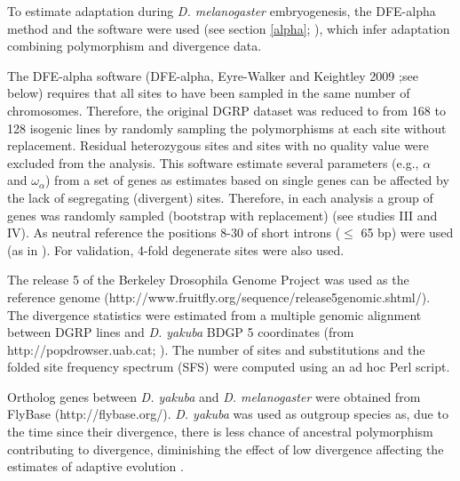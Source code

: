 
To estimate adaptation during \textit{D. melanogaster} embryogenesis, the DFE-alpha method and the software were used (see section \ref{alpha}; \citealp{Eyre-Walker2009}), which infer adaptation combining polymorphism and divergence data.

The DFE-alpha software (DFE-alpha, Eyre-Walker and Keightley 2009 ;see below) requires that all sites to have been sampled in the same number of chromosomes. Therefore, the original DGRP dataset was reduced to from 168 to 128 isogenic lines by randomly sampling the polymorphisms at each site without replacement. Residual heterozygous sites and sites with no quality value were excluded from the analysis.
%
This software estimate several parameters (e.g., $\alpha$ and $\omega_{\alpha}$) from a set of genes as estimates based on single genes can be affected by the lack of segregating (divergent) sites. Therefore, in each analysis a group of genes was randomly sampled (bootstrap with replacement) (see studies III and IV). 
As neutral reference the positions 8-30 of short introns ($\leq$ 65 bp) were used (as in \citealp{Heyn2014}). For validation, 4-fold degenerate sites were also used.

The release 5 of the Berkeley Drosophila Genome Project was used as the reference genome (http://www.fruitfly.org/sequence/release5genomic.shtml/). The divergence statistics were estimated from a multiple genomic alignment between DGRP lines and \textit{D. yakuba} BDGP 5 coordinates (from http://popdrowser.uab.cat; \citealp{Ramia2012}).
The number of sites and substitutions and the folded site frequency spectrum (SFS) were computed using an ad hoc Perl script.

Ortholog genes between \textit{D. yakuba} and \textit{D. melanogaster} were obtained from FlyBase (http://flybase.org/). \textit{D. yakuba} was used as outgroup species as, due to the time since their divergence, there is less chance of ancestral polymorphism contributing to divergence, diminishing the effect of low divergence affecting the estimates of adaptive evolution \citep{Keightley2012}.